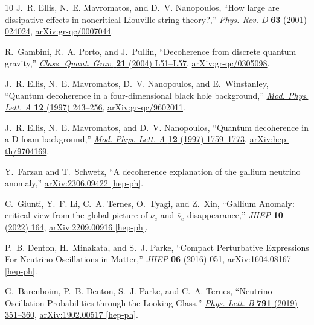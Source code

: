 \documentclass[aps, prd, onecolumn, tightenlines, notitlepage, superscriptaddress, nofootinbib, preprintnumbers, floatfix,showkeys,11pt]{revtex4-2}
\begin{document}
\begin{thebibliography}{10}
J.~R. Ellis, N.~E. Mavromatos, and D.~V. Nanopoulos, ``{How large are
  dissipative effects in noncritical Liouville string theory?},''
  \href{http://dx.doi.org/10.1103/PhysRevD.63.024024}{{\em Phys. Rev. D}
  {\bfseries 63} (2001) 024024},
  \href{http://arxiv.org/abs/gr-qc/0007044}{{\ttfamily arXiv:gr-qc/0007044}}.

R.~Gambini, R.~A. Porto, and J.~Pullin, ``{Decoherence from discrete quantum
  gravity},'' \href{http://dx.doi.org/10.1088/0264-9381/21/8/L01}{{\em Class.
  Quant. Grav.} {\bfseries 21} (2004) L51--L57},
  \href{http://arxiv.org/abs/gr-qc/0305098}{{\ttfamily arXiv:gr-qc/0305098}}.

J.~R. Ellis, N.~E. Mavromatos, D.~V. Nanopoulos, and E.~Winstanley, ``{Quantum
  decoherence in a four-dimensional black hole background},''
  \href{http://dx.doi.org/10.1142/S0217732397000248}{{\em Mod. Phys. Lett. A}
  {\bfseries 12} (1997) 243--256},
  \href{http://arxiv.org/abs/gr-qc/9602011}{{\ttfamily arXiv:gr-qc/9602011}}.

J.~R. Ellis, N.~E. Mavromatos, and D.~V. Nanopoulos, ``{Quantum decoherence in
  a D foam background},''
  \href{http://dx.doi.org/10.1142/S0217732397001795}{{\em Mod. Phys. Lett. A}
  {\bfseries 12} (1997) 1759--1773},
  \href{http://arxiv.org/abs/hep-th/9704169}{{\ttfamily arXiv:hep-th/9704169}}.

Y.~Farzan and T.~Schwetz, ``{A decoherence explanation of the gallium neutrino
  anomaly},'' \href{http://arxiv.org/abs/2306.09422}{{\ttfamily
  arXiv:2306.09422 [hep-ph]}}.

C.~Giunti, Y.~F. Li, C.~A. Ternes, O.~Tyagi, and Z.~Xin, ``{Gallium Anomaly:
  critical view from the global picture of \ensuremath{\nu}$_{e}$ and $
  {\overline{\nu}}_e $ disappearance},''
  \href{http://dx.doi.org/10.1007/JHEP10(2022)164}{{\em JHEP} {\bfseries 10}
  (2022) 164}, \href{http://arxiv.org/abs/2209.00916}{{\ttfamily
  arXiv:2209.00916 [hep-ph]}}.

P.~B. Denton, H.~Minakata, and S.~J. Parke, ``{Compact Perturbative Expressions
  For Neutrino Oscillations in Matter},''
  \href{http://dx.doi.org/10.1007/JHEP06(2016)051}{{\em JHEP} {\bfseries 06}
  (2016) 051}, \href{http://arxiv.org/abs/1604.08167}{{\ttfamily
  arXiv:1604.08167 [hep-ph]}}.

G.~Barenboim, P.~B. Denton, S.~J. Parke, and C.~A. Ternes, ``{Neutrino
  Oscillation Probabilities through the Looking Glass},''
  \href{http://dx.doi.org/10.1016/j.physletb.2019.03.002}{{\em Phys. Lett. B}
  {\bfseries 791} (2019) 351--360},
  \href{http://arxiv.org/abs/1902.00517}{{\ttfamily arXiv:1902.00517
  [hep-ph]}}.


\end{thebibliography}
\end{document}
